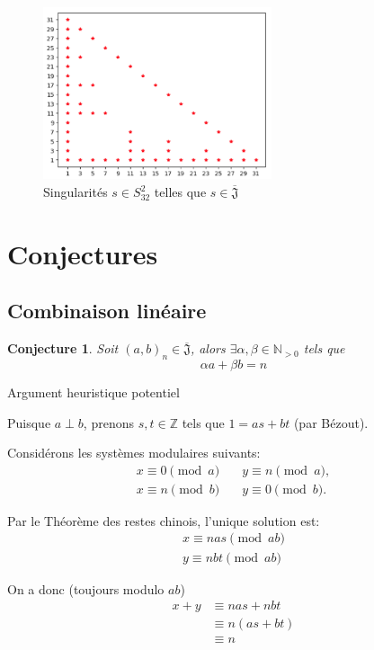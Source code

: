 \documentclass{article}
\newtheorem{conjecture}{Conjecture}
\newcommand{\J}{\mathfrak{J}}
\newcommand{\JS}{\overline{\J}}
\begin{document}
\begin{figure}[h]
    \caption{Singularités $s \in S_{32}^2$ telles que $s \in \JS$}
    \centering
    \includegraphics[width=0.6\textwidth]{singularite_j_strict_m2_n32}
\end{figure}

\newpage

\section{Conjectures}

\subsection{Combinaison linéaire}

\begin{conjecture}
    Soit ${(a, b)}_n \in \JS$, alors $\exists \alpha, \beta \in \mathbb{N}_{>0}$ tels que
    \[ \alpha a + \beta b = n \]
\end{conjecture}

Argument heuristique potentiel

Puisque $a \perp b$, prenons $s, t \in \mathbb{Z}$ tels que $1 = as + bt$ (par Bézout).

Considérons les systèmes modulaires suivants:
\begin{align*}
    x \equiv 0 \pmod a &\quad y \equiv n \pmod a, \\
    x \equiv n \pmod b &\quad y \equiv 0 \pmod b.
\end{align*}

Par le Théorème des restes chinois, l'unique solution est:
\begin{align*}
    x \equiv nas \pmod {ab} \\
    y \equiv nbt \pmod {ab}
\end{align*}

On a donc (toujours modulo $ab$)
\begin{align*}
    x + y & \equiv nas + nbt \\
            & \equiv n(as + bt) \\
            & \equiv n
\end{align*}
\end{document}
